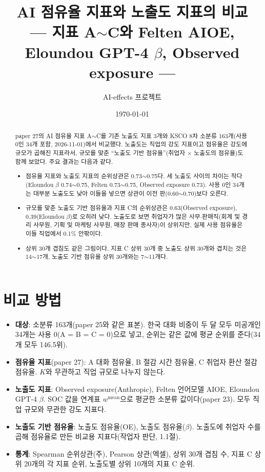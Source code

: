 \documentclass[11pt]{article}
\title{AI 점유율 지표와 노출도 지표의 비교\\[2mm]
\large --- 지표 A$\sim$C와 Felten AIOE, Eloundou GPT-4 $\beta$, Observed exposure ---}
\author{AI-effects 프로젝트}
\date{\today}
\begin{document}
\maketitle

\begin{abstract}
\noindent paper 27의 AI 점유율 지표 A$\sim$C를 기존 노출도 지표 3개와 KSCO 8차 소분류 163개(사용 0인 34개 포함, 2026-11-01)에서 비교했다. 노출도는 직업의 강도 지표이고 점유율은 강도에 규모가 곱해진 지표라서, 규모를 맞춘 ``노출도 기반 점유율''(취업자 $\times$ 노출도의 점유율)도 함께 보았다. 주요 결과는 다음과 같다.
\begin{itemize}[leftmargin=*]
  \item 점유율 지표와 노출도 지표의 순위상관은 0.73$\sim$0.75다. 세 노출도 사이의 차이는 작다(Eloundou $\beta$ 0.74$\sim$0.75, Felten 0.73$\sim$0.75, Observed exposure 0.73). 사용 0인 34개는 대부분 노출도도 낮아 이들을 넣으면 상관이 이전 판(0.60$\sim$0.70)보다 오른다.
  \item 규모를 맞춘 노출도 기반 점유율과 지표 C의 순위상관은 0.63(Observed exposure), 0.39(Eloundou $\beta$)로 오히려 낮다. 노출도로 보면 취업자가 많은 사무$\cdot$판매직(회계 및 경리 사무원, 기획 및 마케팅 사무원, 매장 판매 종사자)이 상위지만, 실제 사용 점유율은 이들 직업에서 0.1\% 안팎이다.
  \item 상위 30개 겹침도 같은 그림이다. 지표 C 상위 30개 중 노출도 상위 30개와 겹치는 것은 14$\sim$17개, 노출도 기반 점유율 상위 30개와는 7$\sim$11개다.
\end{itemize}
\end{abstract}

\section{비교 방법}

\begin{itemize}[leftmargin=*]
  \item \textbf{대상}: 소분류 163개(paper 25와 같은 표본). 한국 대화 비중이 두 달 모두 미공개인 34개는 사용 0(A = B = C = 0)으로 넣고, 순위는 같은 값에 평균 순위를 준다(34개 모두 146.5위).
  \item \textbf{점유율 지표}(paper 27): A 대화 점유율, B 절감 시간 점유율, C 취업자 환산 절감 점유율. $K$와 무관하고 직업 규모로 나누지 않는다.
  \item \textbf{노출도 지표}: Observed exposure(Anthropic), Felten 언어모델 AIOE, Eloundou GPT-4 $\beta$. SOC 값을 연계표 $w^{\text{mean}}$으로 평균한 소분류 값이다(paper 23). 모두 직업 규모와 무관한 강도 지표다.
  \item \textbf{노출도 기반 점유율}: 노출도 점유율(OE), 노출도 점유율($\beta$). 노출도에 취업자 수를 곱해 점유율로 만든 비교용 지표다(작업자 판단, 1.1절).
  \item \textbf{통계}: Spearman 순위상관(주), Pearson 상관(엑셀), 상위 30개 겹침 수, 지표 C 상위 20개의 각 지표 순위, 노출도별 상위 10개의 지표 C 순위.
\end{itemize}
\end{document}

